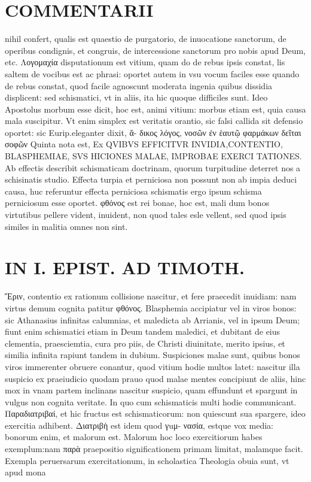 \documentclass{article}
\begin{document}
\begin{pages}
\section*{COMMENTARII }
\marginpar{[ p.152 ]}\pstart nihil confert, qualis est quaestio de purgatorio, de inuocatione sanctorum, de operibus condignis, et congruis, de intercessione sanctorum pro nobis apud Deum, etc.  \pend\pstart Λογομαχία disputationum est vitium, quam do de rebus ipsis constat, lis saltem de vocibus est ac phrasi: oportet autem in vsu vocum faciles esse quando de rebus constat, quod facile agnoscunt moderata ingenia quibus dissidia displicent: sed schismatici, vt in aliis, ita hic quoque difficiles sunt. Ideo Apostolus morbum esse dicit, hoc est, animi vitium: morbus etiam est, quia causa mala suscipitur. Vt enim simplex est veritatis orantio, sic falsi callida sit defensio oportet: sic Eurip.eleganter dixit, ἄ- δικος λόγος, νοσῶν ἐν ἑαυτῷ φαρμάκων δεῖται σοφῶν  \pend\pstart Quinta nota est, Ex QVIBVS EFFICITVR INVIDIA,CONTENTIO, BLASPHEMIAE, SVS HICIONES MALAE, IMPROBAE EXERCI TATIONES. Ab effectis describit schismaticam doctrinam, quorum turpitudine deterret nos a schisinatis studio. Effecta turpia et perniciosa non possunt non ab impia deduci causa, huc referuntur effecta perniciosa schismatis ergo ipsum schisma perniciosum esse oportet. φθόνος est rei bonae, hoc est, mali dum bonos virtutibus pellere vident, inuident, non quod tales esle vellent, sed quod ipsis similes in malitia omnes non sint.  \pend
\section*{IN I. EPIST. AD TIMOTH. }
\marginpar{[ p.153 ]}\pstart Ἔριν, contentio ex rationum collisione nascitur, et fere praecedit inuidiam: nam virtus demum cognita patitur φθόνος.  \pend\pstart Blasphemia accipiatur vel in viros bonos: sic Athanasius infinitas calumnias, et maledicta ab Arrianis, vel in ipsum Deum; fiunt enim schismatici etiam in Deum tandem maledici, et dubitant de eius clementia, praesciemtia, cura pro piis, de Christi diuinitate, merito ipsius, et similia infinita rapiunt tandem in dubium.  \pend\pstart Suspiciones malae sunt, quibus bonos viros immerenter obruere conantur, quod vitium hodie multos latet: nascitur illa suspicio ex praeiudicio quodam prauo quod malae mentes concipiunt de aliis, hinc mox in vnam partem inclinans nascitur suspicio, quam effundunt et spargunt in vulgus non cognita veritate. In quo cum schismaticis multi hodie communicant.  \pend\pstart Παραδιατριβαί, et hic fructus est schismaticorum: non quiescunt sua spargere, ideo exercitia adhibent. Διατριβὴ est idem quod γuμ- νασία, estque vox media: bonorum enim, et malorum est. Malorum hoc loco exercitiorum habes exemplum:nam παρὰ praepositio significationem primam limitat, malamque facit. Exempla peruersarum exercitationum, in scholastica Theologia obuia sunt, vt apud mona\pend

\end{pages}
\end{document}
